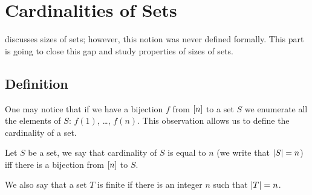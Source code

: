 \chapter{Cardinalities of Sets}
\label{chapter:cardinality}
 discusses sizes of sets; however, this notion was
never defined formally. This part is going to close this gap and study
properties of sizes of sets.


\section{Definition}
One may notice that if we have a bijection $f$ from ${[{n}]}$ to a set $S$ we
enumerate all the elements of $S$: $f(1)$, \dots, $f(n)$.
This observation allows us to define the cardinality of a set.
\begin{definition}
  Let $S$ be a set, we say that cardinality of $S$ is equal to $n$ (we write
  that $\left|{S}\right| = n$) iff there is a bijection from ${[{n}]}$ to $S$.

  We also say that a set $T$ is finite if there is an integer $n$ such that
  $\left|{T}\right| = n$.
\end{definition}

